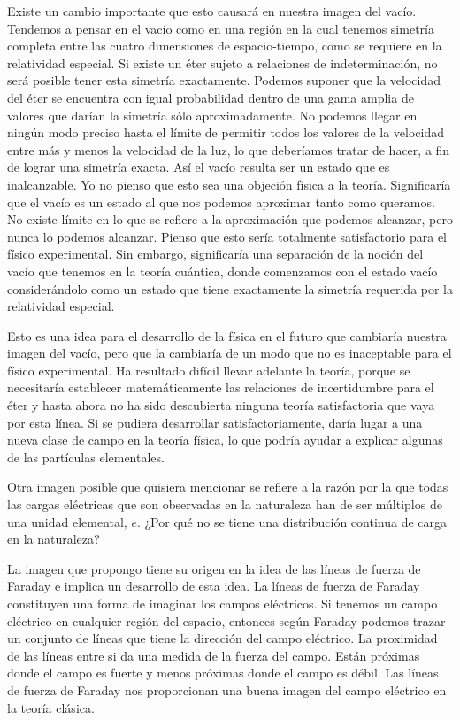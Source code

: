 \documentclass[a4paper, 12pt]{article}
\begin{document}
Existe un cambio importante que esto causará en nuestra imagen del vacío. Tendemos a pensar en el vacío como en una región en la cual tenemos simetría completa entre las cuatro dimensiones de espacio-tiempo, como se requiere en la relatividad especial. Si existe un éter sujeto a relaciones de indeterminación, no será posible tener esta simetría exactamente. Podemos suponer que la velocidad del éter se encuentra con igual probabilidad dentro de una gama amplia de valores que darían la simetría sólo aproximadamente. No podemos llegar en ningún modo preciso hasta el límite de permitir todos los valores de la velocidad entre más y menos la velocidad de la luz, lo que deberíamos tratar de hacer, a fin de lograr una simetría exacta. Así el vacío resulta ser un estado que es inalcanzable. Yo no pienso que esto sea una objeción física a la teoría. Significaría que el vacío es un estado al que nos podemos aproximar tanto como queramos. No existe límite en lo que se refiere a la aproximación que podemos alcanzar, pero nunca lo podemos alcanzar. Pienso que esto sería totalmente satisfactorio para el físico experimental. Sin embargo, significaría una separación de la noción del vacío que tenemos en la teoría cuántica, donde comenzamos con el estado vacío considerándolo como un estado que tiene exactamente la simetría requerida por la relatividad especial.

Esto es una idea para el desarrollo de la física en el futuro que cambiaría nuestra imagen del vacío, pero que la cambiaría de un modo que no es inaceptable para el físico experimental. Ha resultado difícil llevar adelante la teoría, porque se necesitaría establecer matemáticamente las relaciones de incertidumbre para el éter y hasta ahora no ha sido descubierta ninguna teoría satisfactoria que vaya por esta línea. Si se pudiera desarrollar satisfactoriamente, daría lugar a una nueva clase de campo en la teoría física, lo que podría ayudar a explicar algunas de las partículas elementales.


Otra imagen posible que quisiera mencionar se refiere a la razón por la que todas las cargas eléctricas que son observadas en la naturaleza han de ser múltiplos de una unidad elemental, $e$. ¿Por qué no se tiene una distribución continua de carga en la naturaleza?

La imagen que propongo tiene su origen en la idea de las líneas de fuerza de Faraday e implica un desarrollo de esta idea. La líneas de fuerza de Faraday constituyen una forma de imaginar los campos eléctricos. Si tenemos un campo eléctrico en cualquier región del espacio, entonces según Faraday podemos trazar un conjunto de líneas que tiene la dirección del campo eléctrico. La proximidad de las líneas entre si da una medida de la fuerza del campo. Están próximas donde el campo es fuerte y menos próximas donde el campo es débil. Las líneas de fuerza de Faraday nos proporcionan una buena imagen del campo eléctrico en la teoría clásica.
\end{document}
